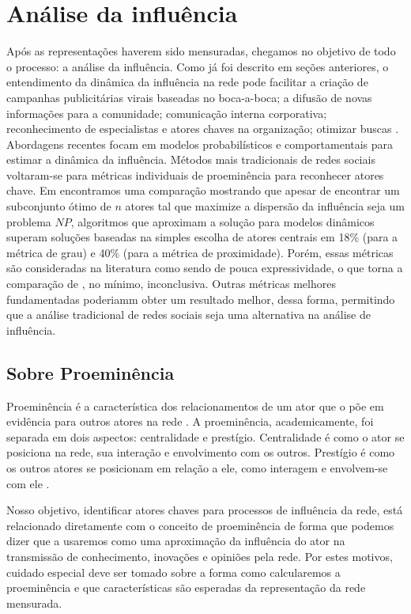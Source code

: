 \chapter{Análise da influência}
\label{ch:mineracao}

Após as representações haverem sido mensuradas, chegamos no objetivo de todo o
processo: a análise da influência. Como já foi descrito em seções anteriores, o
entendimento da dinâmica da influência na rede pode facilitar a criação de
campanhas publicitárias virais baseadas no boca-a-boca; a difusão de novas
informações para a comunidade; comunicação interna corporativa; reconhecimento de
especialistas e atores chaves na organização; otimizar buscas
\citep{Kirchhoff2009}. Abordagens recentes focam em modelos probabilísticos e
comportamentais para estimar a dinâmica da influência. Métodos mais tradicionais
de redes sociais voltaram-se para métricas individuais de proeminência para
reconhecer atores chave. Em \citet{Kempe2003} encontramos uma comparação
mostrando que apesar de encontrar um subconjunto ótimo de $n$ atores tal que
maximize a dispersão da influência seja um problema $NP$, algoritmos que
aproximam a solução para modelos dinâmicos superam soluções baseadas na simples
escolha de atores centrais em 18\% (para a métrica de grau) e 40\% (para a
métrica de proximidade). Porém, essas métricas são consideradas na literatura
como sendo de pouca expressividade, o que torna a comparação de
\citeauthor{Kempe2003}, no mínimo, inconclusiva. Outras métricas melhores
fundamentadas poderiamm obter um resultado melhor, dessa forma, permitindo que a
análise tradicional de redes sociais seja uma alternativa na análise de influência.

\section{Sobre Proeminência}
\label{sec:sobre-proem}
Proeminência é a característica dos relacionamentos de um ator que o põe em
evidência para outros atores na rede \citep{Wasserman}. A proeminência,
academicamente, foi separada em dois aspectos: centralidade e prestígio.
Centralidade é como o ator se posiciona na rede, sua interação e envolvimento com
os outros. Prestígio é como os outros atores se posicionam em relação a ele, como
interagem e envolvem-se com ele \citep{Knoke1983}.

Nosso objetivo, identificar atores chaves para processos de influência da rede,
está relacionado diretamente com o conceito de proeminência de forma que podemos
dizer que a usaremos como uma aproximação da influência do ator na transmissão de
conhecimento, inovações e opiniões pela rede. Por estes motivos, cuidado especial
deve ser tomado sobre a forma como calcularemos a proeminência e que
características são esperadas da representação da rede mensurada.

